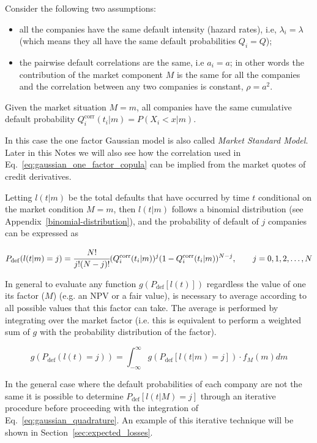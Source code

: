 Consider the following two assumptions:

\begin{itemize}
\tightlist
\item all the companies have the same default intensity (hazard rates), i.e, \(\lambda_i = \lambda\) (which means they all have the same default probabilities $Q_i = Q$);
\item the pairwise default correlations are the same, i.e \(a_i = a\); in other words the contribution of the market component $M$ is the same for all the companies and the correlation between any two companies is constant, \(\rho = a^2\).
\end{itemize}

Given the market situation \(M = m\), all companies have the same cumulative default probability \(Q_i^{\textrm{corr}}(t_i|m)=P(X_i < x|m)\). 

In this case the one factor Gaussian model is also called \emph{Market Standard Model}. Later in this Notes we will also see how the correlation used in Eq.~\ref{eq:gaussian_one_factor_copula} can be implied from the market quotes of credit derivatives.

Letting \(l(t|m)\) be the total defaults that have occurred by time \(t\) conditional on the market condition \(M = m\), then \(l(t|m)\) follows a binomial distribution (see Appendix~\ref{binomial-distribution}), and the probability of default of $j$ companies can be expressed as

\begin{equation}
P_{\mathrm{def}}(l(t|m) = j) = \cfrac{N!}{j!(N-j)!}(Q_i^{\textrm{corr}}(t_i|m))^j(1-Q_i^{\textrm{corr}}(t_i|m))^{N-j},\qquad  j=0, 1, 2,\ldots,N
\end{equation}

In general to evaluate any function $g(P_{\mathrm{def}}[l(t)])$ regardless the value of one its factor ($M$) (e.g. an NPV or a fair value), is necessary to average according to all possible values that this factor can take. The average is performed by integrating over the market factor (i.e. this is equivalent to perform a weighted sum of $g$ with the probability distribution of the factor).  

\begin{equation}
g(P_{\mathrm{def}}(l(t) = j)) = \int_{-\infty}^{\infty}{g(P_{\mathrm{def}}[l(t|m) = j])\cdot f_M(m)dm}
\label{eq:gaussian_quadrature}
\end{equation}

In the general case where the default probabilities of each company are not the same it is possible to determine $P_{\mathrm{def}}[l(t|M)=j]$ through an iterative procedure before proceeding with the integration of Eq.~\ref{eq:gaussian_quadrature}. An example of this iterative technique will be shown in Section~\ref{sec:expected_losses}.

